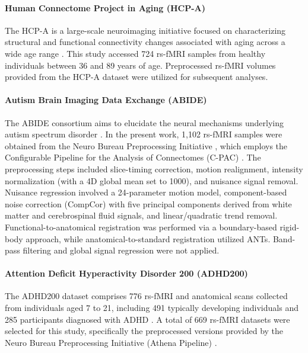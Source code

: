 \paragraph{Human Connectome Project in Aging (HCP-A)}
\label{sec:hcpa}
The HCP-A is a large-scale neuroimaging initiative focused on characterizing structural and functional connectivity changes associated with aging across a wide age range \cite{bookheimer2019lifespan}. This study accessed 724 rs-fMRI samples from healthy individuals between 36 and 89 years of age. Preprocessed rs-fMRI volumes provided from the HCP-A dataset were utilized for subsequent analyses.

\paragraph{Autism Brain Imaging Data Exchange (ABIDE)}
\label{sec:abide}
The ABIDE consortium aims to elucidate the neural mechanisms underlying autism spectrum disorder \cite{di2014autism}. In the present work, 1,102 rs-fMRI samples were obtained from the Neuro Bureau Preprocessing Initiative \cite{craddock2013neuro}, which employs the Configurable Pipeline for the Analysis of Connectomes (C-PAC) \cite{craddock2013towards}. The preprocessing steps included slice-timing correction, motion realignment, intensity normalization (with a 4D global mean set to 1000), and nuisance signal removal. Nuisance regression involved a 24-parameter motion model, component-based noise correction (CompCor) \cite{behzadi2007component} with five principal components derived from white matter and cerebrospinal fluid signals, and linear/quadratic trend removal. Functional-to-anatomical registration was performed via a boundary-based rigid-body approach, while anatomical-to-standard registration utilized ANTs. Band-pass filtering and global signal regression were not applied.


\paragraph{Attention Deficit Hyperactivity Disorder 200 (ADHD200)}
\label{sec:adhd200}
The ADHD200 dataset comprises 776 rs-fMRI and anatomical scans collected from individuals aged 7 to 21, including 491 typically developing individuals and 285 participants diagnosed with ADHD \cite{brown2012adhd}. A total of 669 rs-fMRI datasets were selected for this study, specifically the preprocessed versions provided by the Neuro Bureau Preprocessing Initiative (Athena Pipeline) \cite{bellec2017neuro}.

